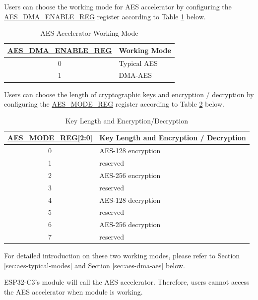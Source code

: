 \documentclass[main\_\_EN.tex]{subfiles}
\begin{document}
Users can choose the working mode for AES accelerator by configuring the \hyperref[regdesc:AESDMAENABLEREG]{AES\_DMA\_ENABLE\_REG} register according to Table \ref{tab:aes-dma-enable} below.

\begin{longtable}[c]{ | c | l | }
\caption{AES Accelerator Working Mode}
    \label{tab:aes-dma-enable}
    \\\hline 
    \rowcolor{lightgray}
\hyperref[regdesc:AESDMAENABLEREG]{AES\_DMA\_ENABLE\_REG}       & Working Mode\\
        \hline
        0                       & Typical AES    \\
        \hline
        1                       & DMA-AES        \\
        \hline
\end{longtable}

Users can choose the length of cryptographic keys and encryption / decryption by configuring the \hyperref[regdesc:AESMODEREG]{AES\_MODE\_REG} register according to Table \ref{tab:aes-operation} below.

\begin{longtable}[c]{ | c | l | }
\caption{Key Length and Encryption/Decryption}
\label{tab:aes-operation}
\\\hline 
\rowcolor{lightgray}
\hyperref[regdesc:AESMODEREG]{AES\_MODE\_REG}[2:0]     & Key Length and Encryption / Decryption\\
    \hline
    0                   & AES-128 encryption    \\
    \hline
    1                   & reserved    \\
    \hline
    2                   & AES-256 encryption    \\
    \hline
    3                   & reserved    \\
    \hline
    4                   & AES-128 decryption    \\
    \hline
    5                   & reserved    \\
    \hline
    6                   & AES-256 decryption    \\
    \hline
    7                   & reserved    \\
    \hline
\end{longtable}

For detailed introduction on these two working modes, please refer to Section \ref{sec:aes-typical-modes} and Section \ref{sec:aes-dma-aes} below.

\begin{importantlisting}
\vspace{-0.5em}

    ESP32-C3's  module will call the AES accelerator. Therefore, users cannot access the AES accelerator when  module is working.
\end{importantlisting}
\end{document}
